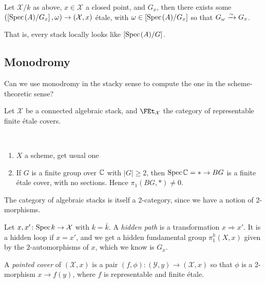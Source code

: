 \documentclass[11pt]{amsart}
\begin{document}
\begin{theorem} Let $\mathcal{X}/k$ as above, $x\in \mathcal{X}$ a closed point, and $G_x$, then there exists some $\left( \left[ \text{Spec}\hspace{0.1em}(A)/G_x \right],\omega \right) \to (\mathcal{X},x)$ \'etale, with $\omega \in \left[ \text{Spec}\hspace{0.1em}(A)/G_x \right]$ so that $G_\omega \xrightarrow{\sim} G_x$.
\end{theorem}

That is, every stack locally looks like $\left[ \text{Spec}\hspace{0.1em}(A)/G \right]$.

\subsection{Monodromy}

Can we use monodromy in the stacky sense to compute the one in the scheme-theoretic sense?

Let $\mathcal{X}$ be a connected algebraic stack, and $\FEt_{\mathcal{X}}$ the category of representable finite \'etale covers.

\begin{example} \,
\begin{enumerate}
    \item $X$ a scheme, get usual one
    \item If $G$ is a finite group over $\mathbb{C}$ with $|G|\ge 2$, then $\text{Spec}\hspace{0.1em} \mathbb{C} = \ast \to BG$ is a finite \'etale cover, with no sections. Hence $\pi_1(BG,\ast) \ne 0$.
\end{enumerate}
\end{example}

\begin{remark} The category of algebraic stacks is itself a 2-category, since we have a notion of 2-morphisms.
\end{remark}

\begin{definition} Let $x,x' \colon \text{Spec}\hspace{0.1em} k \to \mathcal{X}$ with $k=\bar{k}$. A \textit{hidden path} is a transformation $x \Rightarrow x'$. It is a hidden loop if $x=x'$, and we get a hidden fundamental group $\pi_1^h(X,x)$ given by the $2$-automorphisms of $x$, which we know is $G_x$.
\end{definition}

\begin{definition} A \textit{pointed cover} of $(\mathcal{X},x)$ is a pair $(f,\phi) \colon (\mathcal{Y},y) \to (\mathcal{X},x)$ so that $\phi$ is a 2-morphism $x \to f(y)$, where $f$ is representable and finite \'etale.
\end{definition}
\end{document}

